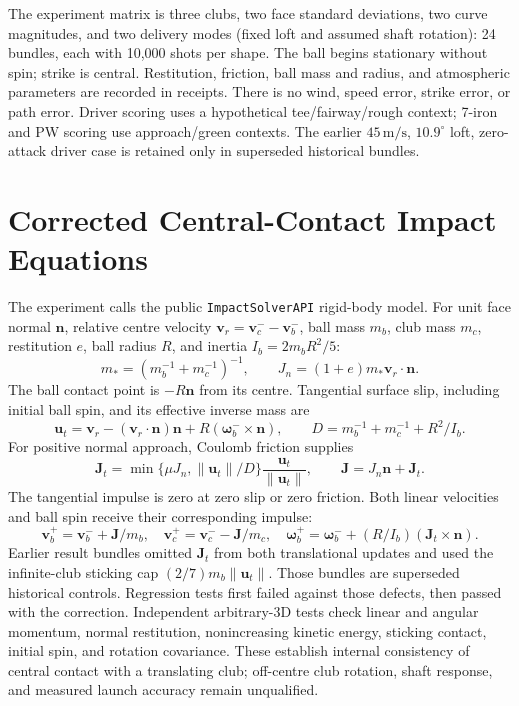 \documentclass[11pt,letterpaper]{article}
\begin{document}
The experiment matrix is three clubs, two face standard deviations, two curve
magnitudes, and two delivery modes (fixed loft and assumed shaft rotation):
24 bundles, each with 10,000 shots per shape. The ball begins stationary
without spin; strike is central. Restitution, friction, ball mass and radius,
and atmospheric parameters are recorded in receipts. There is no wind,
speed error, strike error, or path error. Driver scoring uses a hypothetical
tee/fairway/rough context; 7-iron and PW scoring use approach/green contexts.
The earlier $45\,\mathrm{m/s}$, $10.9^\circ$ loft, zero-attack driver case is
retained only in superseded historical bundles.

\section{Corrected Central-Contact Impact Equations}
The experiment calls the public \texttt{ImpactSolverAPI} rigid-body model.
For unit face normal $\mathbf n$, relative centre velocity
$\mathbf v_r=\mathbf v_c^- -\mathbf v_b^-$, ball mass $m_b$, club mass $m_c$,
restitution $e$, ball radius $R$, and inertia $I_b=2m_bR^2/5$:
\[
 m_*=(m_b^{-1}+m_c^{-1})^{-1},\qquad
 J_n=(1+e)m_*\mathbf v_r\cdot\mathbf n.
\]
The ball contact point is $-R\mathbf n$ from its centre. Tangential surface
slip, including initial ball spin, and its effective inverse mass are
\[
 \mathbf u_t=\mathbf v_r-(\mathbf v_r\cdot\mathbf n)\mathbf n
                 +R(\boldsymbol\omega_b^-\times\mathbf n),\qquad
 D=m_b^{-1}+m_c^{-1}+R^2/I_b.
\]
For positive normal approach, Coulomb friction supplies
\[
 \mathbf J_t=\min\{\mu J_n,\|\mathbf u_t\|/D\}
                 \frac{\mathbf u_t}{\|\mathbf u_t\|},\qquad
 \mathbf J=J_n\mathbf n+\mathbf J_t.
\]
The tangential impulse is zero at zero slip or zero friction. Both linear
velocities and ball spin receive their corresponding impulse:
\[
 \mathbf v_b^+=\mathbf v_b^-+\mathbf J/m_b,\quad
 \mathbf v_c^+=\mathbf v_c^- -\mathbf J/m_c,\quad
 \boldsymbol\omega_b^+=\boldsymbol\omega_b^-+
                 (R/I_b)(\mathbf J_t\times\mathbf n).
\]
Earlier result bundles omitted $\mathbf J_t$ from both translational updates
and used the infinite-club sticking cap $(2/7)m_b\|\mathbf u_t\|$.
Those bundles are superseded historical controls. Regression tests first
failed against those defects, then passed with the correction. Independent
arbitrary-3D tests check linear and angular momentum, normal restitution,
nonincreasing kinetic energy, sticking contact, initial spin, and rotation
covariance. These establish internal consistency of central contact with a
translating club; off-centre club rotation, shaft response, and measured launch
accuracy remain unqualified.
\end{document}
